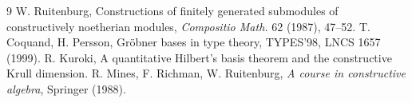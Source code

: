 \documentclass[11pt]{amsart}
\theoremstyle{definition}
\theoremstyle{remark}
\begin{document}
\begin{thebibliography}{9}
 W. Ruitenburg, Constructions of finitely generated submodules
  of constructively noetherian modules, \emph{Compositio Math.} 62 (1987),
  47--52.
 T. Coquand, H. Persson, Gröbner bases in type theory,
  TYPES'98, LNCS 1657 (1999).
 R. Kuroki, A quantitative Hilbert's basis theorem and the
  constructive Krull dimension.
 R. Mines, F. Richman, W. Ruitenburg, \emph{A course in
  constructive algebra}, Springer (1988).
\end{thebibliography}
\end{document}
